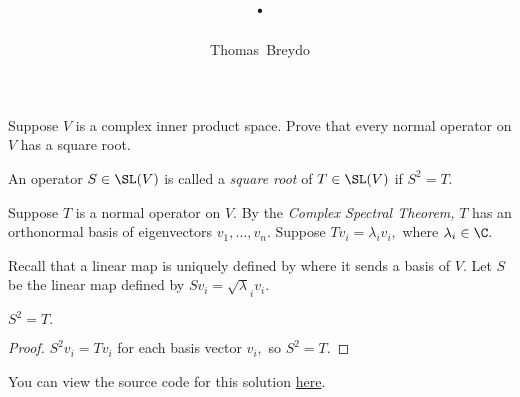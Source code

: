 \documentclass{amsart}
\title{\pagenum.\probnum}
\author{Thomas\ Breydo}
\newcommand{\pagenum}{223}
\newcommand{\probnum}{9}
\begin{document}
\maketitle

\begin{problem*}
Suppose $V$ is a complex inner product space. Prove
that every normal operator on $V$ has a square root.
\end{problem*}

\begin{note*}
An operator $S\in\SL(V)$ is called a \textit{square root}
of $T\in\SL(V)$ if $S^2=T.$
\end{note*}

\vspace{0.5in}

Suppose $T$ is a normal operator on $V.$ By the
\textit{Complex Spectral Theorem,} $T$ has
an orthonormal basis of eigenvectors $v_1,\dots,v_n.$
Suppose $Tv_i=\lambda_iv_i,$ where $\lambda_i\in\C.$

Recall that a linear map is uniquely defined by where
it sends a basis of $V.$ Let $S$ be the linear map defined by
$Sv_i=\sqrt\lambda_iv_i.$
\begin{claim*}
$S^2=T.$
\end{claim*}
\begin{proof}
$S^2v_i=Tv_i$ for each basis vector $v_i,$ so $S^2=T.$
\end{proof}

\vspace{0.5in}

\begin{note*}
You can view the source code for this solution
\href{https://github.com/thomasbreydo/linalg/blob/main/\pagenum_\probnum_Thomas_Breydo.tex}
{here}.
\end{note*}
\end{document}
